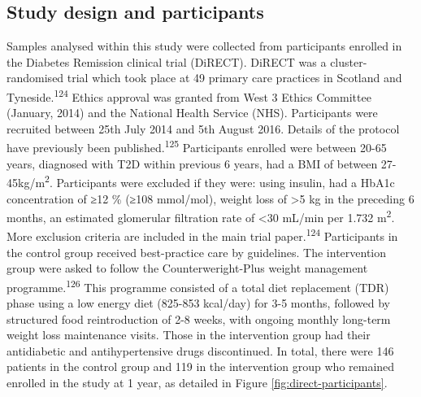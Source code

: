\documentclass[11pt,twoside]{bristolthesis}
\begin{document}
\hypertarget{study-design-and-participants}{%
\subsection{Study design and participants}\label{study-design-and-participants}}

Samples analysed within this study were collected from participants enrolled in the Diabetes Remission clinical trial (DiRECT). DiRECT was a cluster-randomised trial which took place at 49 primary care practices in Scotland and Tyneside.\textsuperscript{124} Ethics approval was granted from West 3 Ethics Committee (January, 2014) and the National Health Service (NHS). Participants were recruited between 25th July 2014 and 5th August 2016. Details of the protocol have previously been published.\textsuperscript{125} Participants enrolled were between 20-65 years, diagnosed with T2D within previous 6 years, had a BMI of between 27-45kg/m\textsuperscript{2}. Participants were excluded if they were: using insulin, had a HbA1c concentration of ≥12 \% (≥108 mmol/mol), weight loss of \textgreater5 kg in the preceding 6 months, an estimated glomerular filtration rate of \textless30 mL/min per 1.732 m\textsuperscript{2}. More exclusion criteria are included in the main trial paper.\textsuperscript{124} Participants in the control group received best-practice care by guidelines. The intervention group were asked to follow the Counterweright-Plus weight management programme.\textsuperscript{126} This programme consisted of a total diet replacement (TDR) phase using a low energy diet (825-853 kcal/day) for 3-5 months, followed by structured food reintroduction of 2-8 weeks, with ongoing monthly long-term weight loss maintenance visits. Those in the intervention group had their antidiabetic and antihypertensive drugs discontinued. In total, there were 146 patients in the control group and 119 in the intervention group who remained enrolled in the study at 1 year, as detailed in Figure \ref{fig:direct-participants}.
\end{document}
